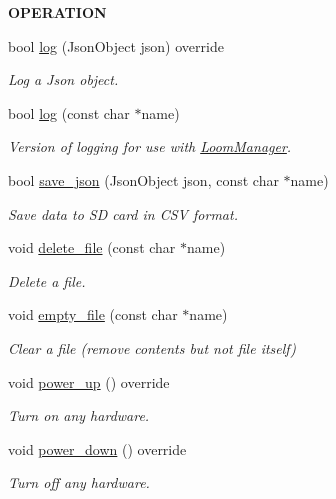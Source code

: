 \begin{Indent}{\bf O\+P\+E\+R\+A\+T\+I\+ON}\par
\begin{DoxyCompactItemize}
\item 
bool \hyperlink{class_loom___s_d_a0f106e4911985253e8ac09bcf953bb6e}{log} (Json\+Object json) override
\begin{DoxyCompactList}\small\item\em Log a Json object. \end{DoxyCompactList}\item 
bool \hyperlink{class_loom___s_d_a9a281c97934fa0f54653408aa84ade6b}{log} (const char $\ast$name)
\begin{DoxyCompactList}\small\item\em Version of logging for use with \hyperlink{class_loom_manager}{Loom\+Manager}. \end{DoxyCompactList}\item 
bool \hyperlink{class_loom___s_d_af5a463b90af2eb0debe01a24f23a6a4f}{save\+\_\+json} (Json\+Object json, const char $\ast$name)
\begin{DoxyCompactList}\small\item\em Save data to SD card in C\+SV format. \end{DoxyCompactList}\item 
void \hyperlink{class_loom___s_d_adecc011e82fac7f1543b3f588bbf4816}{delete\+\_\+file} (const char $\ast$name)
\begin{DoxyCompactList}\small\item\em Delete a file. \end{DoxyCompactList}\item 
void \hyperlink{class_loom___s_d_aed577fc3915c42de474a992f81c827ac}{empty\+\_\+file} (const char $\ast$name)
\begin{DoxyCompactList}\small\item\em Clear a file (remove contents but not file itself) \end{DoxyCompactList}\item 
void \hyperlink{class_loom___s_d_a316af7fd9cd88c33aa9aa06755cc37fd}{power\+\_\+up} () override
\begin{DoxyCompactList}\small\item\em Turn on any hardware. \end{DoxyCompactList}\item 
void \hyperlink{class_loom___s_d_a01d99de8b39b25f562f2aeec3413170e}{power\+\_\+down} () override
\begin{DoxyCompactList}\small\item\em Turn off any hardware. \end{DoxyCompactList}\end{DoxyCompactItemize}
\end{Indent}
